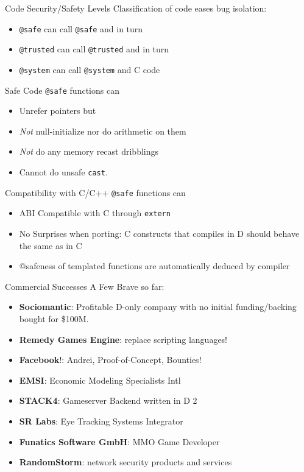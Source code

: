 \documentclass[xcolor=dvipsnames]{beamer}
\begin{document}
\begin{frame}[fragile]{Code Security/Safety Levels}
  Classification of code eases bug isolation:
  \begin{itemize}[<+->]
  \item \texttt{@safe} can call \texttt{@safe} and in turn
  \item \texttt{@trusted} can call \texttt{@trusted} and in turn
  \item \texttt{@system} can call \texttt{@system} and C code
  \end{itemize}
\end{frame}

\begin{frame}[fragile]{Safe Code}
  \texttt{@safe} functions can
  \begin{itemize}[<+->]
  \item Unrefer pointers but
  \item \emph{Not} null-initialize nor do arithmetic on them
  \item \emph{Not} do any memory recast dribblings
  \item Cannot do unsafe \texttt{cast}.
  \end{itemize}
\end{frame}

\begin{frame}[fragile]{Compatibility with C/C++}
  \texttt{@safe} functions can
  \begin{itemize}[<+->]
  \item ABI Compatible with C through \texttt{extern}
  \item No Surprises when porting: C constructs that compiles in D should
    behave the same as in C
  \item @safeness of templated functions are automatically deduced by compiler
  \end{itemize}
\end{frame}

\begin{frame}[fragile]{Commercial Successes}
  A Few Brave so far:
  \begin{itemize}[<+->]
  \item \textbf{Sociomantic}: Profitable D-only company with no initial
    funding/backing bought for \$100M.
  \item \textbf{Remedy Games Engine}: replace scripting languages!
  \item \textbf{Facebook}!: Andrei, Proof-of-Concept, Bounties!
  \item \textbf{EMSI}: Economic Modeling Specialists Intl
  \item \textbf{STACK4}: Gameserver Backend written in D 2
  \item \textbf{SR Labs}: Eye Tracking Systems Integrator
  \item \textbf{Funatics Software GmbH}: MMO Game Developer
  \item \textbf{RandomStorm}: network security products and services
  \end{itemize}
\end{frame}
\end{document}
